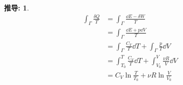 \documentclass[UTF8]{ctexart}
\newcommand{\<}{\langle}
\renewcommand{\>}{\rangle}                              %
\newenvironment{prf_box}{
    \begin{tcolorbox}[enhanced, colback=prf_grey2, boxrule=0pt, frame hidden,
        borderline west={0.7mm}{0.1mm}{prf_grey1},breakable]
    }
    {\end{tcolorbox}}
\theoremstyle{MyStyle} %
\newtheorem*{myproof}{推导: \newline}
\newenvironment{prf}{\begin{prf_box}\begin{myproof}}{\end{myproof}\end{prf_box}}
\begin{document}
        \begin{prf}
            \[
            \begin{aligned}
                \int_{\varGamma}\frac{\delta Q}{T}
                & = \int_{\varGamma}\frac{\dd E - \delta W}{T}\\
                & = \int_{\varGamma}\frac{\dd E + p\dd V}{T}\\
                & = \int_{\varGamma}\frac{C_V}{T}\dd T+\int_{\varGamma}\frac{p}{T}\dd V\\
                & = \int_{T_0}^{T}\frac{C_V}{T}\dd T+\int_{V_0}^{V}\frac{\nu R}{V}\dd V\\
                & = C_V\ln\frac{T}{T_0}+\nu R\ln\frac{V}{V_0}\\
            \end{aligned}\]
        \end{prf}
    
\end{document}
